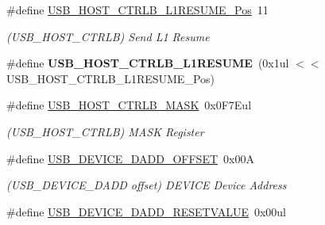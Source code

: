 \begin{DoxyCompactItemize}
\item 
\hypertarget{group___s_a_m_l21___u_s_b_ga4c9a833dc120257bf101713b9ead8131}{}\#define \hyperlink{group___s_a_m_l21___u_s_b_ga4c9a833dc120257bf101713b9ead8131}{U\+S\+B\+\_\+\+H\+O\+S\+T\+\_\+\+C\+T\+R\+L\+B\+\_\+\+L1\+R\+E\+S\+U\+M\+E\+\_\+\+Pos}~11\label{group___s_a_m_l21___u_s_b_ga4c9a833dc120257bf101713b9ead8131}

\begin{DoxyCompactList}\small\item\em (U\+S\+B\+\_\+\+H\+O\+S\+T\+\_\+\+C\+T\+R\+L\+B) Send L1 Resume \end{DoxyCompactList}\item 
\hypertarget{group___s_a_m_l21___u_s_b_gacee9fe6a19bcde9c53ae9c4e88665294}{}\#define {\bfseries U\+S\+B\+\_\+\+H\+O\+S\+T\+\_\+\+C\+T\+R\+L\+B\+\_\+\+L1\+R\+E\+S\+U\+M\+E}~(0x1ul $<$$<$ U\+S\+B\+\_\+\+H\+O\+S\+T\+\_\+\+C\+T\+R\+L\+B\+\_\+\+L1\+R\+E\+S\+U\+M\+E\+\_\+\+Pos)\label{group___s_a_m_l21___u_s_b_gacee9fe6a19bcde9c53ae9c4e88665294}

\item 
\hypertarget{group___s_a_m_l21___u_s_b_gaa78947196ae372e8ff9218773d935924}{}\#define \hyperlink{group___s_a_m_l21___u_s_b_gaa78947196ae372e8ff9218773d935924}{U\+S\+B\+\_\+\+H\+O\+S\+T\+\_\+\+C\+T\+R\+L\+B\+\_\+\+M\+A\+S\+K}~0x0\+F7\+Eul\label{group___s_a_m_l21___u_s_b_gaa78947196ae372e8ff9218773d935924}

\begin{DoxyCompactList}\small\item\em (U\+S\+B\+\_\+\+H\+O\+S\+T\+\_\+\+C\+T\+R\+L\+B) M\+A\+S\+K Register \end{DoxyCompactList}\item 
\hypertarget{group___s_a_m_l21___u_s_b_ga0f3542ac45dbe09bb59c4ee4e78d09d0}{}\#define \hyperlink{group___s_a_m_l21___u_s_b_ga0f3542ac45dbe09bb59c4ee4e78d09d0}{U\+S\+B\+\_\+\+D\+E\+V\+I\+C\+E\+\_\+\+D\+A\+D\+D\+\_\+\+O\+F\+F\+S\+E\+T}~0x00\+A\label{group___s_a_m_l21___u_s_b_ga0f3542ac45dbe09bb59c4ee4e78d09d0}

\begin{DoxyCompactList}\small\item\em (U\+S\+B\+\_\+\+D\+E\+V\+I\+C\+E\+\_\+\+D\+A\+D\+D offset) D\+E\+V\+I\+C\+E Device Address \end{DoxyCompactList}\item 
\hypertarget{group___s_a_m_l21___u_s_b_gae3708710b894fe84bcf61a4ea6552adb}{}\#define \hyperlink{group___s_a_m_l21___u_s_b_gae3708710b894fe84bcf61a4ea6552adb}{U\+S\+B\+\_\+\+D\+E\+V\+I\+C\+E\+\_\+\+D\+A\+D\+D\+\_\+\+R\+E\+S\+E\+T\+V\+A\+L\+U\+E}~0x00ul\label{group___s_a_m_l21___u_s_b_gae3708710b894fe84bcf61a4ea6552adb}


\end{DoxyCompactItemize}
